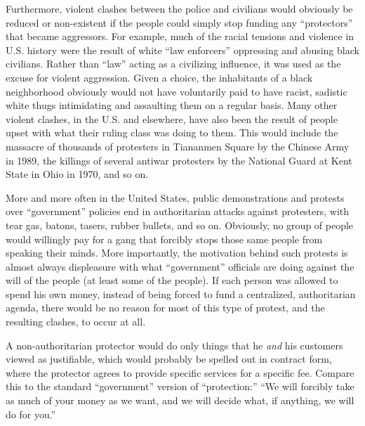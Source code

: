 \documentclass{book}
\begin{document}
Furthermore, violent clashes between the police and civilians would obviously be reduced or non-existent if the people could simply stop funding any \enquote{protectors} that became aggressors. For example, much of the racial tensions and violence in U.S. history were the result of white \enquote{law enforcers} oppressing and abusing black civilians. Rather than \enquote{law} acting as a civilizing influence, it was used as the excuse for violent aggression. Given a choice, the inhabitants of a black neighborhood obviously would not have voluntarily paid to have racist, sadistic white thugs intimidating and assaulting them on a regular basis. Many other violent clashes, in the U.S. and elsewhere, have also been the result of people upset with what their ruling class was doing to them. This would include the massacre of thousands of protesters in Tiananmen Square by the Chinese Army in 1989, the killings of several antiwar protesters by the National Guard at Kent State in Ohio in 1970, and so on.

More and more often in the United States, public demonstrations and protests over \enquote{government} policies end in authoritarian attacks against protesters, with tear gas, batons, tasers, rubber bullets, and so on. Obviously, no group of people would willingly pay for a gang that forcibly stops those same people from speaking their minds. More importantly, the motivation behind such protests is almost always displeasure with what \enquote{government} officials are doing against the will of the people (at least some of the people). If each person was allowed to spend his own money, instead of being forced to fund a centralized, authoritarian agenda, there would be no reason for most of this type of protest, and the resulting clashes, to occur at all.

A non-authoritarian protector would do only things that he \emph{and} his customers viewed as justifiable, which would probably be spelled out in contract form, where the protector agrees to provide specific services for a specific fee. Compare this to the standard \enquote{government} version of \enquote{protection:} \enquote{We will forcibly take as much of your money as we want, and we will decide what, if anything, we will do for you.}
\end{document}
